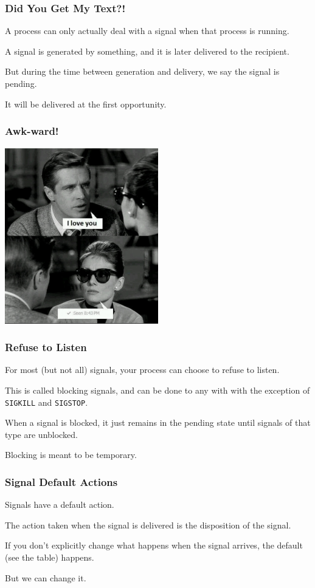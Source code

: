 \begin{frame}
\frametitle{Did You Get My Text?!}

A process can only actually deal with a signal when that process is running. 

A signal is generated by something, and it is later delivered to the recipient. 

But during the time between generation and delivery, we say the signal is \alert{pending}.

It will be delivered at the first opportunity.

\end{frame}


\begin{frame}
\frametitle{Awk-ward!}

\begin{center}
	\includegraphics[width=0.5\textwidth]{images/seenmeme.jpeg}
\end{center}

\end{frame}


\begin{frame}
\frametitle{Refuse to Listen}

For most (but not all) signals, your process can choose to refuse to listen.  

This is called blocking signals, and can be done to any with with the exception of \texttt{SIGKILL} and \texttt{SIGSTOP}.

When a signal is blocked, it just remains in the pending state until signals of that type are unblocked.

Blocking is meant to be temporary.

\end{frame}


\begin{frame}
\frametitle{Signal Default Actions}

Signals have a default action. 

The action taken when the signal is delivered is the \alert{disposition} of the signal. 

If you don't explicitly change what happens when the signal arrives, the default (see the table) happens. 

But we can change it.

\end{frame}


